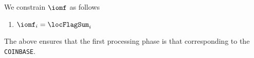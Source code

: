 We constrain $\iomf$ as follows
\begin{enumerate}
	\item
		$\iomf _{i} = \locFlagSum _{i}$
\end{enumerate}
\saNote{}
The above ensures that the first processing phase is that corresponding to the \texttt{COINBASE}.

